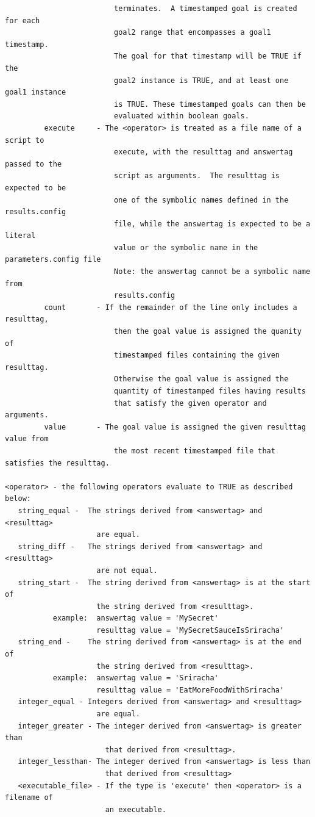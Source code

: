 \documentclass[12pt]{article}
\begin{document}
\begin{verbatim}
                         terminates.  A timestamped goal is created for each
                         goal2 range that encompasses a goal1 timestamp.
                         The goal for that timestamp will be TRUE if the
                         goal2 instance is TRUE, and at least one goal1 instance
                         is TRUE. These timestamped goals can then be
                         evaluated within boolean goals.
         execute     - The <operator> is treated as a file name of a script to 
                         execute, with the resulttag and answertag passed to the 
                         script as arguments.  The resulttag is expected to be 
                         one of the symbolic names defined in the results.config 
                         file, while the answertag is expected to be a literal 
                         value or the symbolic name in the parameters.config file 
                         Note: the answertag cannot be a symbolic name from 
                         results.config 
         count       - If the remainder of the line only includes a resulttag,
                         then the goal value is assigned the quanity of 
                         timestamped files containing the given resulttag.  
                         Otherwise the goal value is assigned the
                         quantity of timestamped files having results
                         that satisfy the given operator and arguments.
         value       - The goal value is assigned the given resulttag value from
                         the most recent timestamped file that satisfies the resulttag.
 
<operator> - the following operators evaluate to TRUE as described below:
   string_equal -  The strings derived from <answertag> and <resulttag>
                     are equal.
   string_diff -   The strings derived from <answertag> and <resulttag>
                     are not equal.
   string_start -  The string derived from <answertag> is at the start of 
                     the string derived from <resulttag>.
           example:  answertag value = 'MySecret'
                     resulttag value = 'MySecretSauceIsSriracha'
   string_end -    The string derived from <answertag> is at the end of
                     the string derived from <resulttag>.
           example:  answertag value = 'Sriracha'
                     resulttag value = 'EatMoreFoodWithSriracha'
   integer_equal - Integers derived from <answertag> and <resulttag>
                     are equal.
   integer_greater - The integer derived from <answertag> is greater than
                       that derived from <resulttag>.
   integer_lessthan- The integer derived from <answertag> is less than
                       that derived from <resulttag>
   <executable_file> - If the type is 'execute' then <operator> is a filename of 
                       an executable.
             

\end{verbatim}
\end{document}
